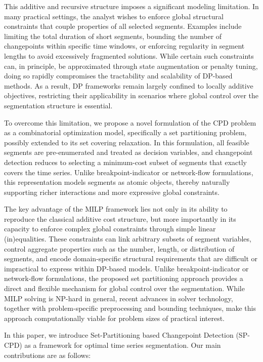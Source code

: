 \documentclass[preprints,article,submit,pdftex,moreauthors]{Definitions/mdpi}
\begin{document}
This additive and recursive structure imposes a significant modeling limitation. In many practical settings, the analyst wishes to enforce global structural constraints that couple properties of all selected segments. Examples include limiting the total duration of short segments, bounding the number of changepoints within specific time windows, or enforcing regularity in segment lengths to avoid excessively fragmented solutions. While certain such constraints can, in principle, be approximated through state augmentation or penalty tuning, doing so rapidly compromises the tractability and scalability of DP-based methods. As a result, DP frameworks remain largely confined to locally additive objectives, restricting their applicability in scenarios where global control over the segmentation structure is essential.

To overcome this limitation, we propose a novel formulation of the CPD problem as a combinatorial optimization model, specifically a set partitioning problem, possibly extended to its set covering relaxation. In this formulation, all feasible segments are pre-enumerated and treated as decision variables, and changepoint detection reduces to selecting a minimum-cost subset of segments that exactly covers the time series. Unlike breakpoint-indicator or network-flow formulations, this representation models segments as atomic objects, thereby naturally supporting richer interactions and more expressive global constraints.

The key advantage of the MILP framework lies not only in its ability to reproduce the classical additive cost structure, but more importantly in its capacity to enforce complex global constraints through simple linear (in)equalities. These constraints can link arbitrary subsets of segment variables, control aggregate properties such as the number, length, or distribution of segments, and encode domain-specific structural requirements that are difficult or impractical to express within DP-based models. Unlike breakpoint-indicator or network-flow formulations, the proposed set partitioning approach provides a direct and flexible mechanism for global control over the segmentation. While MILP solving is NP-hard in general, recent advances in solver technology, together with problem-specific preprocessing and bounding techniques, make this approach computationally viable for problem sizes of practical interest.

In this paper, we introduce Set-Partitioning based Changepoint Detection (SP-CPD) as a framework for optimal time series segmentation. Our main contributions are as follows:
\end{document}
